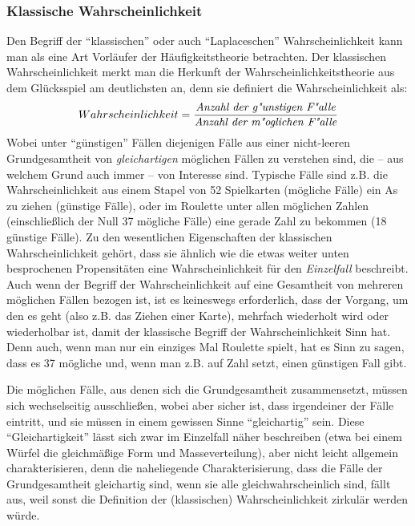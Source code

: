 \subsubsection{Klassische Wahrscheinlichkeit}
\label{LaplacescheWahrscheinlichkeit}
Den Begriff der "`klassischen"' oder auch "`Laplaceschen"' Wahrscheinlichkeit kann
man als eine Art Vorläufer der Häufigkeitstheorie betrachten. Der klassischen
Wahrscheinlichkeit merkt man die Herkunft der
Wahrscheinlichkeitstheorie aus dem Glücksspiel am deutlichsten an, denn sie
definiert die Wahrscheinlichkeit als:
\[Wahrscheinlichkeit = \frac{\mbox{{\em Anzahl der g"unstigen
F"alle}}}{\mbox{{\em Anzahl der m"oglichen F"alle}}}\]
Wobei unter "`günstigen"' Fällen diejenigen Fälle aus einer nicht-leeren
Grundgesamtheit von {\em gleichartigen} möglichen Fällen zu verstehen sind, 
die -- aus welchem Grund auch immer -- von Interesse sind. Typische Fälle sind z.B. die
Wahrscheinlichkeit aus einem Stapel von 52 Spielkarten (mögliche Fälle) ein As
zu ziehen (günstige Fälle), oder im Roulette unter allen möglichen Zahlen
(einschließlich der Null 37 mögliche Fälle) eine gerade Zahl zu bekommen (18
günstige Fälle). Zu den wesentlichen Eigenschaften der klassischen
Wahrscheinlichkeit gehört, dass sie ähnlich wie die etwas weiter unten
besprochenen Propensitäten eine Wahrscheinlichkeit für den {\em Einzelfall}
beschreibt. Auch wenn der Begriff der Wahrscheinlichkeit auf eine Gesamtheit
von mehreren möglichen Fällen bezogen ist, ist es keineswegs erforderlich, dass
der Vorgang, um den es geht (also z.B. das Ziehen einer Karte), mehrfach
wiederholt wird oder wiederholbar ist, damit der klassische Begriff der
Wahrscheinlichkeit Sinn hat. Denn auch, wenn man nur ein einziges Mal Roulette
spielt, hat es Sinn zu sagen, dass es 37 mögliche und, wenn man z.B. auf Zahl
setzt, einen günstigen Fall gibt.

Die möglichen Fälle, aus denen sich die Grundgesamtheit zusammensetzt, müssen
sich wechselseitig ausschließen, wobei aber sicher ist, dass irgendeiner der
Fälle eintritt, und sie müssen in einem gewissen Sinne "`gleichartig"' sein.
Diese "`Gleichartigkeit"' lässt sich zwar im Einzelfall näher beschreiben 
(etwa bei einem Würfel die gleichmäßige Form und Masseverteilung), 
aber nicht leicht allgemein charakterisieren, denn die
naheliegende Charakterisierung, dass die Fälle der Grundgesamtheit gleichartig
sind, wenn sie alle gleichwahrscheinlich sind, fällt aus, weil sonst die
Definition der (klassischen) Wahrscheinlichkeit zirkulär werden würde. 

